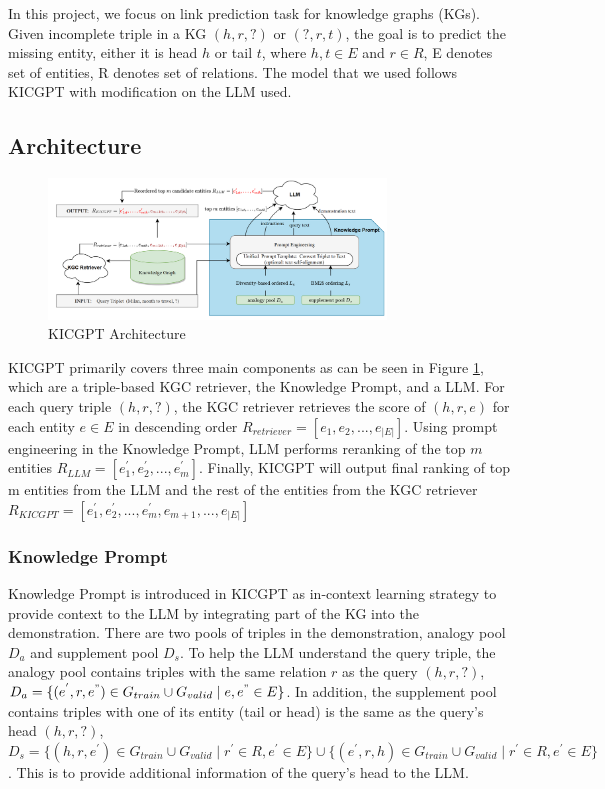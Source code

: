 In this project, we focus on link prediction task for knowledge graphs 
(KGs). Given incomplete triple in a KG \((h, r, ?)\) or \((?, r, t)\), 
the goal is to predict the missing entity, either it is head \(h\) 
or tail \(t\), where \(h, t \in E\) and \(r \in R\), E denotes set of 
entities, R denotes set of relations. The model that we used follows 
KICGPT \cite{wei2023kicgpt} with modification on the LLM used. 

\subsection{Architecture}
\label{sec:method:architecture}

\begin{figure}
    \centering
    \includegraphics[width=0.8\textwidth]{figures/arc3.png}
    \caption{KICGPT Architecture \cite{wei2023kicgpt}}
    \label{fig:KICGPTarchitecture}
\end{figure}

KICGPT primarily covers three main components as can be seen in Figure 
\ref{fig:KICGPTarchitecture}, which are a triple-based KGC retriever, 
the Knowledge Prompt, and a LLM. For each query triple \((h, r, ?)\), 
the KGC retriever retrieves the score of \((h, r, e)\) for each entity 
\(e \in E\) in descending order 
\(R_{retriever} = [e_1, e_2, ..., e_{|E|}]\). 
Using prompt engineering in the Knowledge Prompt, LLM performs reranking 
of the top \(m\) entities 
\(R_{LLM} = [e^{'}_1, e^{'}_2, ..., e^{'}_m]\). Finally, KICGPT will 
output final ranking of top m entities from the LLM and the rest of
the entities from the KGC retriever 
\(R_{KICGPT} = [e^{'}_1, e^{'}_2, ..., e^{'}_m, e_{m+1}, ..., e_{|E|}]\)

\subsubsection{Knowledge Prompt}
Knowledge Prompt is introduced in KICGPT as in-context learning
strategy to provide context to the LLM by integrating part of the KG
into the demonstration. There are two pools of triples in the 
demonstration, analogy pool \(D_a\) and supplement pool \(D_s\). 
To help the LLM understand the query triple, the analogy pool contains 
triples with the same relation \(r\) as the query \((h, r, ?)\), 
\(D_a = \{(e^{'}, r, e^{"}) \in G_{train} \cup G_{valid} \mid e, e^{"} \in E\}\).
In addition, the supplement pool contains triples with one of its entity 
(tail or head) is the same as the query's head \((h, r, ?)\),
\(D_s = \{(h, r, e^{'}) \in G_{train} \cup G_{valid} \mid r^{'} \in R, e^{'} \in E\} \cup
\{(e^{'}, r, h) \in G_{train} \cup G_{valid} \mid r^{'} \in R, e^{'} \in E\}\).
This is to provide additional information of the query's head to the LLM.

